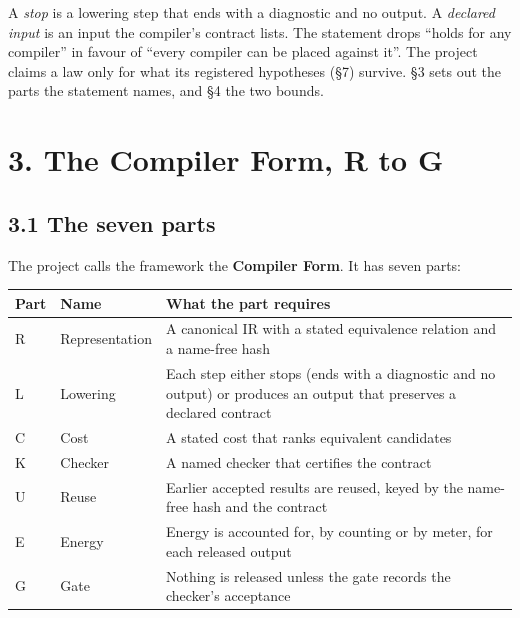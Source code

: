\documentclass[10pt,letterpaper]{article}
\begin{document}
A \emph{stop} is a lowering step that ends with a diagnostic and no
output. A \emph{declared input} is an input the compiler's contract
lists. The statement drops ``holds for any compiler'' in favour of
``every compiler can be placed against it''. The project claims a law
only for what its registered hypotheses (§7) survive. §3 sets out the
parts the statement names, and §4 the two bounds.

\section{3. The Compiler Form, R to G}\label{the-compiler-form-r-to-g}

\subsection{3.1 The seven parts}\label{the-seven-parts}

The project calls the framework the \textbf{Compiler Form}. It has seven
parts:

{\footnotesize\setlength{\tabcolsep}{3.8pt}\renewcommand{\arraystretch}{1.15}
\begin{longtable}[]{@{}
  >{\raggedright\arraybackslash}p{}
  >{\raggedright\arraybackslash}p{}
  >{\raggedright\arraybackslash}p{}@{}}
\toprule\noalign{}
\begin{minipage}[b]{\linewidth}\raggedright
\textbf{Part}
\end{minipage} & \begin{minipage}[b]{\linewidth}\raggedright
\textbf{Name}
\end{minipage} & \begin{minipage}[b]{\linewidth}\raggedright
\textbf{What the part requires}
\end{minipage} \\
\midrule\noalign{}
\endhead
\bottomrule\noalign{}
\endlastfoot
R & Representation & A canonical IR with a stated equivalence relation
and a name-free hash \\
L & Lowering & Each step either stops (ends with a diagnostic and no
output) or produces an output that preserves a declared contract \\
C & Cost & A stated cost that ranks equivalent candidates \\
K & Checker & A named checker that certifies the contract \\
U & Reuse & Earlier accepted results are reused, keyed by the name-free
hash and the contract \\
E & Energy & Energy is accounted for, by counting or by meter, for each
released output \\
G & Gate & Nothing is released unless the gate records the checker's
acceptance \\
\end{longtable}
}
\end{document}
